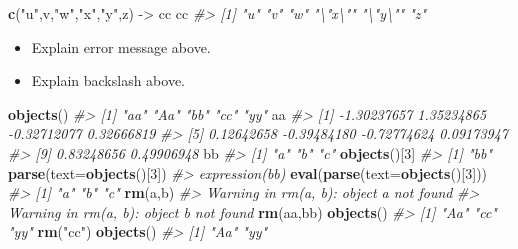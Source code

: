 \documentclass[
]{book}
\newenvironment{Shaded}{\begin{snugshade}}{\end{snugshade}}
\newcommand{\AttributeTok}[1]{\textcolor[rgb]{0.13,0.29,0.53}{#1}}
\newcommand{\CommentTok}[1]{\textcolor[rgb]{0.56,0.35,0.01}{\textit{#1}}}
\newcommand{\DecValTok}[1]{\textcolor[rgb]{0.00,0.00,0.81}{#1}}
\newcommand{\FunctionTok}[1]{\textcolor[rgb]{0.13,0.29,0.53}{\textbf{#1}}}
\newcommand{\NormalTok}[1]{#1}
\newcommand{\OtherTok}[1]{\textcolor[rgb]{0.56,0.35,0.01}{#1}}
\newcommand{\StringTok}[1]{\textcolor[rgb]{0.31,0.60,0.02}{#1}}
\providecommand{\tightlist}{%
  \setlength{\itemsep}{0pt}\setlength{\parskip}{0pt}}
\begin{document}
\begin{Shaded}
\begin{Highlighting}[]
\FunctionTok{c}\NormalTok{(}\StringTok{"u"}\NormalTok{,}\StringTok{\textquotesingle{}v\textquotesingle{}}\NormalTok{,}\StringTok{"\textquotesingle{}w\textquotesingle{}"}\NormalTok{,}\StringTok{\textquotesingle{}"x"\textquotesingle{}}\NormalTok{,}\StringTok{\textquotesingle{}"y"\textquotesingle{}}\NormalTok{,}\StringTok{\textquotesingle{}z\textquotesingle{}}\NormalTok{) }\OtherTok{{-}\textgreater{}}\NormalTok{ cc }
\NormalTok{cc}
\CommentTok{\#\textgreater{} [1] "u"     "v"     "\textquotesingle{}w\textquotesingle{}"   "\textbackslash{}"x\textbackslash{}"" "\textbackslash{}"y\textbackslash{}"" "z"}
\end{Highlighting}
\end{Shaded}

\begin{itemize}
\tightlist
\item
  Explain error message above.
\item
  Explain backslash above.
\end{itemize}

\begin{Shaded}
\begin{Highlighting}[]
\FunctionTok{objects}\NormalTok{()}
\CommentTok{\#\textgreater{} [1] "aa" "Aa" "bb" "cc" "yy"}
\NormalTok{aa}
\CommentTok{\#\textgreater{}  [1] {-}1.30237657  1.35234865 {-}0.32712077  0.32666819}
\CommentTok{\#\textgreater{}  [5]  0.12642658 {-}0.39484180 {-}0.72774624  0.09173947}
\CommentTok{\#\textgreater{}  [9]  0.83248656  0.49906948}
\NormalTok{bb}
\CommentTok{\#\textgreater{} [1] "a" "b" "c"}
\FunctionTok{objects}\NormalTok{()[}\DecValTok{3}\NormalTok{]}
\CommentTok{\#\textgreater{} [1] "bb"}
\FunctionTok{parse}\NormalTok{(}\AttributeTok{text=}\FunctionTok{objects}\NormalTok{()[}\DecValTok{3}\NormalTok{])}
\CommentTok{\#\textgreater{} expression(bb)}
\FunctionTok{eval}\NormalTok{(}\FunctionTok{parse}\NormalTok{(}\AttributeTok{text=}\FunctionTok{objects}\NormalTok{()[}\DecValTok{3}\NormalTok{]))}
\CommentTok{\#\textgreater{} [1] "a" "b" "c"}
\FunctionTok{rm}\NormalTok{(a,b)}
\CommentTok{\#\textgreater{} Warning in rm(a, b): object \textquotesingle{}a\textquotesingle{} not found}
\CommentTok{\#\textgreater{} Warning in rm(a, b): object \textquotesingle{}b\textquotesingle{} not found}
\FunctionTok{rm}\NormalTok{(aa,bb)}
\FunctionTok{objects}\NormalTok{()}
\CommentTok{\#\textgreater{} [1] "Aa" "cc" "yy"}
\FunctionTok{rm}\NormalTok{(}\StringTok{"cc"}\NormalTok{)}
\FunctionTok{objects}\NormalTok{()}
\CommentTok{\#\textgreater{} [1] "Aa" "yy"}
\end{Highlighting}
\end{Shaded}
\end{document}
